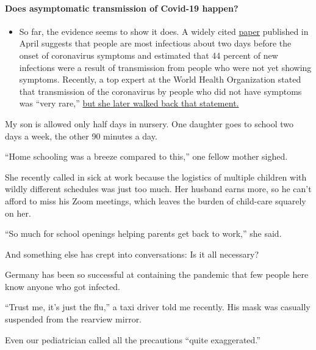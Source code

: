 \begin{itemize}
{  \paragraph{Does asymptomatic transmission of Covid-19
  happen?}\label{does-asymptomatic-transmission-of-covid-19-happen}}

  \begin{itemize}
  \tightlist
  \item
    So far, the evidence seems to show it does. A widely cited
    \href{https://www.nature.com/articles/s41591-020-0869-5}{paper}
    published in April suggests that people are most infectious about
    two days before the onset of coronavirus symptoms and estimated that
    44 percent of new infections were a result of transmission from
    people who were not yet showing symptoms. Recently, a top expert at
    the World Health Organization stated that transmission of the
    coronavirus by people who did not have symptoms was ``very rare,''
    \href{https://www.nytimes.com/2020/06/09/world/coronavirus-updates.html?action=click\&pgtype=Article\&state=default\&region=MAIN_CONTENT_3\&context=storylines_faq\#link-1f302e21}{but
    she later walked back that statement.}
  \end{itemize}
\end{itemize}

My son is allowed only half days in nursery. One daughter goes to school
two days a week, the other 90 minutes a day.

``Home schooling was a breeze compared to this,'' one fellow mother
sighed.

She recently called in sick at work because the logistics of multiple
children with wildly different schedules was just too much. Her husband
earns more, so he can't afford to miss his Zoom meetings, which leaves
the burden of child-care squarely on her.

``So much for school openings helping parents get back to work,'' she
said.

And something else has crept into conversations: Is it all necessary?

Germany has been so successful at containing the pandemic that few
people here know anyone who got infected.

``Trust me, it's just the flu,'' a taxi driver told me recently. His
mask was casually suspended from the rearview mirror.

Even our pediatrician called all the precautions ``quite exaggerated.''

